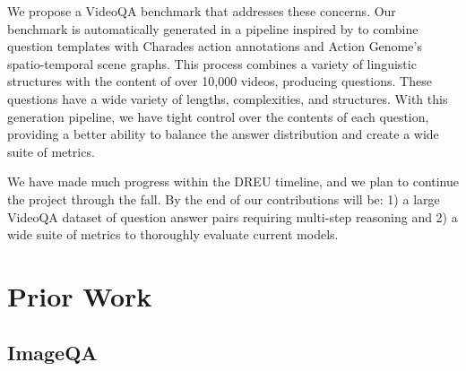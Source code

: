 \documentclass{article}
\newcommand{\mgm}[1]{{\color{cyan}{mgm: #1}}}
\begin{document}
We propose a VideoQA benchmark that addresses these concerns. Our benchmark is automatically generated in a pipeline inspired by \cite{hudson2019gqa} to combine question templates with Charades action annotations and Action Genome's spatio-temporal scene graphs. This process combines a variety of linguistic structures with the content of over 10,000 videos, producing \mgm{add here} questions. These questions have a wide variety of lengths, complexities, and structures. With this generation pipeline, we have tight control over the contents of each question, providing a better ability to balance the answer distribution and create a wide suite of metrics.

We have made much progress within the DREU timeline, and we plan to continue the project through the fall. By the end of our contributions will be: 1) a large VideoQA dataset of question answer pairs requiring multi-step reasoning and 2) a wide suite of metrics to thoroughly evaluate current models.

\section{Prior Work}

\subsection{ImageQA}
\end{document}
